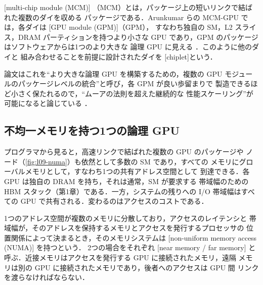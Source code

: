 \documentclass[../main.tex]{subfiles}
\begin{document}
\begin{definition}
  [multi-chip module (MCM)]
  （MCM）とは，パッケージ上の短いリンクで結ばれた複数のダイを収める
  パッケージである．Arunkumar らの MCM-GPU では，各ダイは
  [GPU module (GPM)]（GPM），
  すなわち独自の SM，L2 スライス，DRAM パーティションを持つより小さな
  GPU であり，GPM のパッケージはソフトウェアからは1つのより大きな
  論理 GPU に見える \cite{arunkumar2017mcmgpu}．このように他のダイと
  組み合わせることを前提に設計されたダイを
  [chiplet]という．
\end{definition}

論文はこれを\enquote{より大きな論理 GPU を構築するための，複数の
GPU モジュールのパッケージレベルの統合}と呼び，各 GPM が良い歩留まりで
製造できるほど小さく保たれるので，\enquote{ムーアの法則を超えた継続的な
性能スケーリング}が可能になると論じている
\cite{arunkumar2017mcmgpu}．

\subsection{不均一メモリを持つ1つの論理 GPU}

プログラマから見ると，高速リンクで結ばれた複数の GPU のパッケージや
ノード（\cref{fig:l09-numa}）も依然として多数の SM であり，すべての
メモリにグローバルメモリとして，すなわち1つの共有アドレス空間として
到達できる．各 GPU は独自の DRAM を持ち，それは通常，SM が要求する
帯域幅のための HBM スタック（第1章）である．一方，システムの残りへの
I/O 帯域幅はすべての GPU で共有される．変わるのはアクセスのコストである．

\begin{definition}
  1つのアドレス空間が複数のメモリに分散しており，アクセスのレイテンシと
  帯域幅が，そのアドレスを保持するメモリとアクセスを発行するプロセッサの
  位置関係によって決まるとき，そのメモリシステムは
  [non-uniform memory access (NUMA)]
  を持つという．
  2つの場合をそれぞれ
  [near memory / far memory]
  と呼ぶ．近接メモリはアクセスを発行する GPU に接続されたメモリ，遠隔
  メモリは別の GPU に接続されたメモリであり，後者へのアクセスは GPU 間
  リンクを渡らなければならない．
\end{definition}
\end{document}
